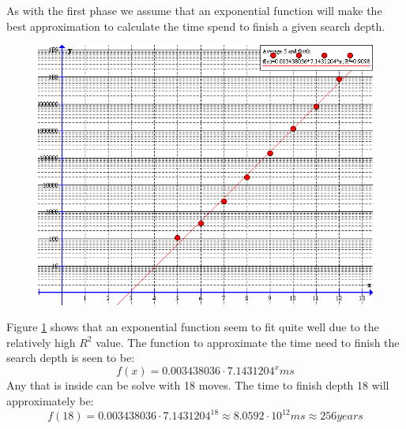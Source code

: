 As with the first phase we assume that an exponential function will make the best approximation to calculate the time spend to finish a given search depth.

\begin{figure}[htb]
	\centering
		\includegraphics[scale=0.5]{input/pics/timeFunction2}
	\caption{}
	\label{fig:timeFunction2}
\end{figure}
Figure \ref{fig:timeFunction2} shows that an exponential function seem to fit quite well due to the relatively high $R^2$ value.
The function to approximate the time need to finish the search depth is seen to be:
\[
f(x) = 0.003438036 \cdot 7.1431204^{x} ms
\]
Any \rubik{} that is inside  can be solve with 18  moves.
The time to finish depth 18 will approximately be:
\[
f(18) = 0.003438036 \cdot 7.1431204^{18} \approx 8.0592 \cdot 10^{12} ms \approx 256 years
\]